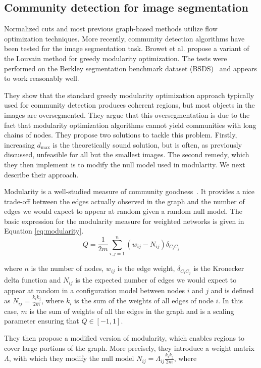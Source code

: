 \documentclass[conference]{IEEEtran}
\begin{document}
\subsection{Community detection for image segmentation}
Normalized cuts and most previous graph-based methods utilize flow optimization techniques. More recently, community detection algorithms have been tested for the image segmentation task. Browet et al. propose a variant of the Louvain method for greedy modularity optimization. The tests were performed on the Berkley segmentation benchmark dataset (BSDS)~\cite{MartinFTM01} and appears to work reasonably well.

They show that the standard greedy modularity optimization approach typically used for community detection produces coherent regions, but most objects in the images are oversegmented. They argue that this oversegmentation is due to the fact that modularity optimization algorithms cannot yield communities with long chains of nodes. They propose two solutions to tackle this problem. Firstly, increasing $d_{\text{max}}$ is the theoretically sound solution, but is often, as previously discussed, unfeasible for all but the smallest images. The second remedy, which they then implement is to modify the null model used in modularity. We next describe their approach.

Modularity is a well-studied measure of community goodness~\cite{newman2004finding}. It provides a nice trade-off between the edges actually observed in the graph and the number of edges we would expect to appear at random given a random null model. The basic expression for the modularity measure for weighted networks is given in Equation \ref{eq:modularity}.
\begin{equation}
    Q = \frac{1}{2m}\sum_{i, j = 1}^{n}\left ( w_{ij} - N_{ij} \right ) \delta_{C_i C_j}
    \label{eq:modularity}
\end{equation}

where $n$ is the number of nodes, $w_{ij}$ is the edge weight,  $\delta_{C_i C_j}$ is the Kronecker delta function and $N_{ij}$ is the expected number of edges we would expect to appear at random in a configuration model between nodes $i$ and $j$ and is defined as $N_{ij} = \frac{k_i k_j}{2m}$, where $k_i$ is the sum of the weights of all edges of node $i$. In this case, $m$ is the sum of weights of all the edges in the graph and is a scaling parameter ensuring that $Q \in \left [ -1, 1 \right ]$.

They then propose a modified version of modularity, which enables regions to cover large portions of the graph. More precisely, they introduce a weight matrix $\Lambda$, with which they modify the null model $N_{ij} = \Lambda_{ij} \frac{k_i k_j}{2m}$, where
\end{document}
